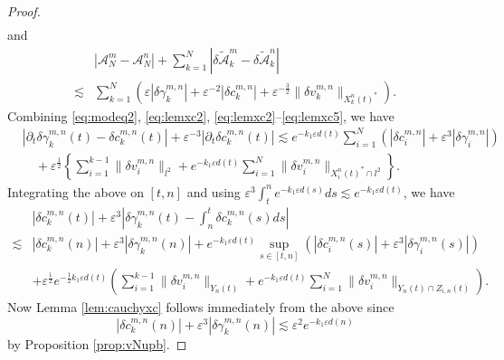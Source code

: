 \documentclass[11pt]{amsart}
\theoremstyle{remark}
\numberwithin{equation}{section}
\begin{document}
\begin{proof}
\begin{equation}
\begin{split}
  \end{split}
\end{equation}
and 
\begin{equation}
  \label{eq:lemxc5}
  \begin{split}
& \left|\mathcal{A}_N^m-\mathcal{A}_N^n\right| +\sum_{k=1}^N
\left|\delta\widetilde{\mathcal{A}}_k^m-\delta\widetilde{\mathcal{A}}_k^n\right|
\\  \lesssim & \sum_{k=1}^N \left({\varepsilon}|{\delta\gamma}^{m,n}_k|
+{\varepsilon}^{-2}|{\delta c}^{m,n}_k|+{\varepsilon}^{-\frac32}\|{\delta v}_k^{m,n}\|_{X_k^n(t)^*}\right).
 \end{split}
\end{equation}
Combining \eqref{eq:modeq2}, 
\eqref{eq:lemxc2}, \eqref{eq:lemxc2}--\eqref{eq:lemxc5}, we have
\begin{equation}
  \label{eq:dotx-cdif}
  \begin{split}
& \left|{\partial}_t{\delta\gamma}^{m,n}_k(t)-{\delta c}^{m,n}_k(t)\right|+{\varepsilon}^{-3}\left|{\partial}_t{\delta c}^{m,n}_k(t)\right|
 \lesssim  e^{-k_1{\varepsilon} d(t)}\sum_{i=1}^N(|{\delta c}^{m,n}_i|+{\varepsilon}^3|{\delta\gamma}^{m,n}_i|)
\\ & \quad +{\varepsilon}^{\frac12}\left\{\sum_{i=1}^{k-1}\|{\delta v}_i^{m,n}\|_{l^2}
+e^{-k_1{\varepsilon} d(t)}\sum_{i=1}^N\|{\delta v}_i^{m,n}\|_{X_i^n(t)^*\cap l^2}\right\}.
\end{split}
\end{equation}
Integrating the above on $[t,n]$ and using
${\varepsilon}^3\int_t^ne^{-k_1{\varepsilon} d(s)}ds \lesssim e^{-k_1{\varepsilon} d(t)}$, we have
\begin{align*}
& |{\delta c}^{m,n}_k(t)|+{\varepsilon}^3\left|{\delta\gamma}^{m,n}_k(t)-\int_n^t{\delta c}^{m,n}_k(s)ds\right|
\\ \lesssim & |{\delta c}^{m,n}_k(n)|+{\varepsilon}^3|{\delta\gamma}^{m,n}_k(n)|+
e^{-k_1{\varepsilon} d(t)}\sup_{s\in[t,n]} (|{\delta c}^{m,n}_i(s)|+{\varepsilon}^3|{\delta\gamma}^{m,n}_i(s)|)
\\ & +{\varepsilon}^{\frac12}e^{-\frac12k_1{\varepsilon} d(t)}\left(\sum_{i=1}^{k-1}\|{\delta v}_i^{m,n}\|_{Y_n(t)}
+e^{-k_1{\varepsilon} d(t)}\sum_{i=1}^N\|{\delta v}_i^{m,n}\|_{Y_n(t)\cap Z_{i,n}(t)}\right).
\end{align*}
Now Lemma \ref{lem:cauchyxc} follows immediately from the above since
 $$|{\delta c}^{m,n}_k(n)|+{\varepsilon}^3|{\delta\gamma}^{m,n}_k(n)|\lesssim {\varepsilon}^2e^{-k_1{\varepsilon} d(n)}$$
by Proposition \ref{prop:vNupb}.
\end{proof}
\end{document}
